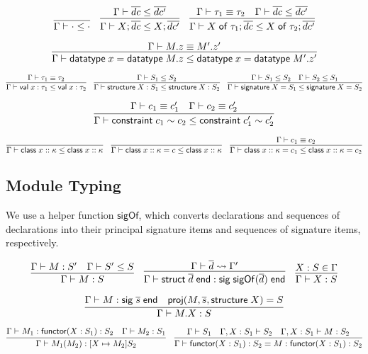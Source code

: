 \documentclass{article}
\newcommand{\mt}[1]{\mathsf{#1}}
\begin{document}
$$\infer{\Gamma \vdash \cdot \leq \cdot}{}
\quad \infer{\Gamma \vdash X; \overline{dc} \leq X; \overline{dc'}}{
  \Gamma \vdash \overline{dc} \leq \overline{dc'}
}
\quad \infer{\Gamma \vdash X \; \mt{of} \; \tau_1; \overline{dc} \leq X \; \mt{of} \; \tau_2; \overline{dc'}}{
  \Gamma \vdash \tau_1 \equiv \tau_2
  & \Gamma \vdash \overline{dc} \leq \overline{dc'}
}$$

$$\infer{\Gamma \vdash \mt{datatype} \; x = \mt{datatype} \; M.z \leq \mt{datatype} \; x = \mt{datatype} \; M'.z'}{
  \Gamma \vdash M.z \equiv M'.z'
}$$

$$\infer{\Gamma \vdash \mt{val} \; x : \tau_1 \leq \mt{val} \; x : \tau_2}{
  \Gamma \vdash \tau_1 \equiv \tau_2
}
\quad \infer{\Gamma \vdash \mt{structure} \; X : S_1 \leq \mt{structure} \; X : S_2}{
  \Gamma \vdash S_1 \leq S_2
}
\quad \infer{\Gamma \vdash \mt{signature} \; X = S_1 \leq \mt{signature} \; X = S_2}{
  \Gamma \vdash S_1 \leq S_2
  & \Gamma \vdash S_2 \leq S_1
}$$

$$\infer{\Gamma \vdash \mt{constraint} \; c_1 \sim c_2 \leq \mt{constraint} \; c'_1 \sim c'_2}{
  \Gamma \vdash c_1 \equiv c'_1
  & \Gamma \vdash c_2 \equiv c'_2
}$$

$$\infer{\Gamma \vdash \mt{class} \; x :: \kappa \leq \mt{class} \; x :: \kappa}{}
\quad \infer{\Gamma \vdash \mt{class} \; x :: \kappa = c \leq \mt{class} \; x :: \kappa}{}
\quad \infer{\Gamma \vdash \mt{class} \; x :: \kappa = c_1 \leq \mt{class} \; x :: \kappa = c_2}{
  \Gamma \vdash c_1 \equiv c_2
}$$

\subsection{Module Typing}

We use a helper function $\mt{sigOf}$, which converts declarations and sequences of declarations into their principal signature items and sequences of signature items, respectively.

$$\infer{\Gamma \vdash M : S}{
  \Gamma \vdash M : S'
  & \Gamma \vdash S' \leq S
}
\quad \infer{\Gamma \vdash \mt{struct} \; \overline{d} \; \mt{end} : \mt{sig} \; \mt{sigOf}(\overline{d}) \; \mt{end}}{
  \Gamma \vdash \overline{d} \leadsto \Gamma'
}
\quad \infer{\Gamma \vdash X : S}{
  X : S \in \Gamma
}$$

$$\infer{\Gamma \vdash M.X : S}{
  \Gamma \vdash M : \mt{sig} \; \overline{s} \; \mt{end}
  & \mt{proj}(M, \overline{s}, \mt{structure} \; X) = S
}$$

$$\infer{\Gamma \vdash M_1(M_2) : [X \mapsto M_2]S_2}{
  \Gamma \vdash M_1 : \mt{functor}(X : S_1) : S_2
  & \Gamma \vdash M_2 : S_1
}
\quad \infer{\Gamma \vdash \mt{functor} (X : S_1) : S_2 = M : \mt{functor} (X : S_1) : S_2}{
  \Gamma \vdash S_1
  & \Gamma, X : S_1 \vdash S_2
  & \Gamma, X : S_1 \vdash M : S_2
}$$
\end{document}
